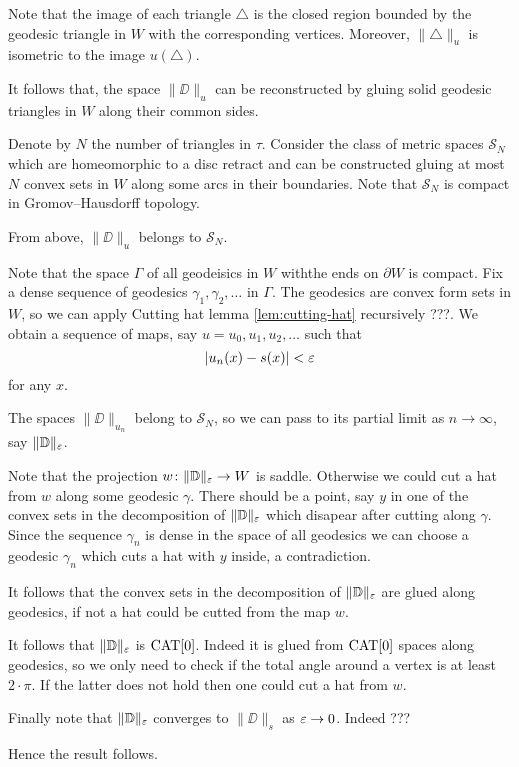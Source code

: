 \documentclass[a4paper,10pt]{amsart}
\begin{document}
Note that the image of each triangle $\triangle$
is the closed region bounded by the geodesic triangle in $W$ with the corresponding vertices.
Moreover,  $\|\triangle\|_u$ is isometric to the image $u(\triangle)$.

It follows that, the space $\|\DD\|_u$ can be reconstructed by gluing solid geodesic triangles in $W$ along their common sides.

Denote by $N$ the number of triangles in $\tau$.
Consider the class of metric spaces $\mathcal{S}_N$ 
which are homeomorphic to a disc retract
and can be constructed gluing at most $N$ convex sets in $W$ 
along some arcs in their boundaries.
Note that $\mathcal{S}_N$ is compact in Gromov--Hausdorff topology.

From above, $\|\DD\|_u$ belongs to $\mathcal{S}_N$.  

Note that the space $\Gamma$ of all geodeisics in $W$ withthe ends on $\partial W$ is compact. 
Fix a dense sequence of geodesics $\gamma_1,\gamma_2,\dots$ in $\Gamma$.
The geodesics are convex form sets in $W$, so we can apply Cutting hat lemma \ref{lem:cutting-hat}
recursively ???.
We obtain a sequence of maps, say $u=u_0,u_1,u_2,\dots$ such that 
\[|u_n(x)-s(x)|<\varepsilon\]
for any $x$.

The spaces $\|\DD\|_{u_n}$ belong to $\mathcal{S}_N$,
so we can pass to its partial limit as $n\to\infty$,
say $\|\mathbb{D}\|_\varepsilon$.

Note that the projection $w\colon\|\mathbb{D}\|_\varepsilon\to W$ is saddle.
Otherwise we could cut a hat from $w$ along some geodesic $\gamma$.
There should be a point, say $y$ in one of the convex sets in the decomposition of $\|\mathbb{D}\|_\varepsilon$ which disapear after cutting along $\gamma$.
Since the sequence $\gamma_n$ is dense in the space of all geodesics
we can choose a geodesic $\gamma_n$ which cuts a hat with $y$ inside, a contradiction.

It follows that the convex sets in the decomposition of $\|\mathbb{D}\|_\varepsilon$ are glued along geodesics,
if not a hat could be cutted from the map $w$.

It follows that $\|\mathbb{D}\|_\varepsilon$ is $\mathop{\rm CAT}\nolimits[0]$. Indeed it is glued from $\mathop{\rm CAT}\nolimits[0]$ spaces along geodesics,
so we only need to check if the total angle around a vertex is at least $2\cdot\pi$.
If the latter does not hold then one could cut a hat from $w$. %

Finally note that $\|\mathbb{D}\|_\varepsilon$ converges to $\|\DD\|_s$ as $\varepsilon\to 0$. 
Indeed ???

Hence the result follows.
\qeds
\end{document}
